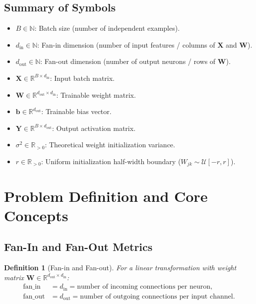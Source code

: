 \documentclass[11pt]{article}
\newtheorem{definition}{Definition}
\begin{document}
\subsection{Summary of Symbols}
\begin{itemize}
    \item $B \in \mathbb{N}$: Batch size (number of independent examples).
    \item $d_{\text{in}} \in \mathbb{N}$: Fan-in dimension (number of input features / columns of $\mathbf{X}$ and $\mathbf{W}$).
    \item $d_{\text{out}} \in \mathbb{N}$: Fan-out dimension (number of output neurons / rows of $\mathbf{W}$).
    \item $\mathbf{X} \in \mathbb{R}^{B \times d_{\text{in}}}$: Input batch matrix.
    \item $\mathbf{W} \in \mathbb{R}^{d_{\text{out}} \times d_{\text{in}}}$: Trainable weight matrix.
    \item $\mathbf{b} \in \mathbb{R}^{d_{\text{out}}}$: Trainable bias vector.
    \item $\mathbf{Y} \in \mathbb{R}^{B \times d_{\text{out}}}$: Output activation matrix.
    \item $\sigma^2 \in \mathbb{R}_{>0}$: Theoretical weight initialization variance.
    \item $r \in \mathbb{R}_{>0}$: Uniform initialization half-width boundary ($W_{jk} \sim \mathcal{U}[-r, r]$).
\end{itemize}

\section{Problem Definition and Core Concepts}
\label{sec:problem_definition}

\subsection{Fan-In and Fan-Out Metrics}
\begin{definition}[Fan-in and Fan-out]
For a linear transformation with weight matrix $\mathbf{W} \in \mathbb{R}^{d_{\text{out}} \times d_{\text{in}}}$:
\begin{align}
\text{fan\_in} &= d_{\text{in}} = \text{number of incoming connections per neuron}, \\
\text{fan\_out} &= d_{\text{out}} = \text{number of outgoing connections per input channel}.
\end{align}
\end{definition}
\end{document}
